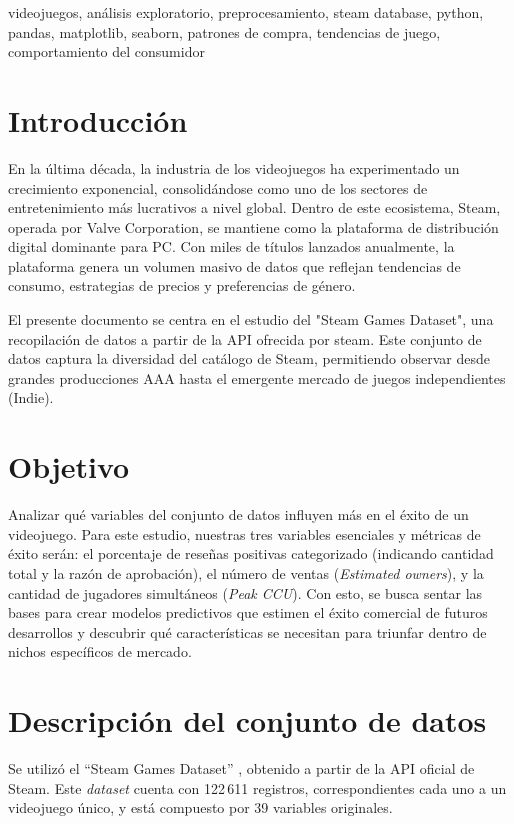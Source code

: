 \documentclass[conference]{IEEEtran}
\begin{document}
\begin{IEEEkeywords}
  videojuegos, análisis exploratorio, preprocesamiento, steam database, python, pandas, matplotlib, seaborn, patrones de compra, tendencias de juego, comportamiento del consumidor
\end{IEEEkeywords}

\section{Introducción}

En la última década, la industria de los videojuegos ha experimentado un crecimiento exponencial, consolidándose como uno de los sectores de entretenimiento más lucrativos a nivel global. Dentro de este ecosistema, Steam, operada por Valve Corporation, se mantiene como la plataforma de distribución digital dominante para PC. Con miles de títulos lanzados anualmente, la plataforma genera un volumen masivo de datos que reflejan tendencias de consumo, estrategias de precios y preferencias de género.

El presente documento se centra en el estudio del "Steam Games Dataset", una recopilación de datos a partir de la API ofrecida por steam. Este conjunto de datos captura la diversidad del catálogo de Steam, permitiendo observar desde grandes producciones AAA hasta el emergente mercado de juegos independientes (Indie).

\section{Objetivo}


Analizar qué variables del conjunto de datos influyen más en el éxito de un videojuego. Para este estudio, nuestras tres variables esenciales y métricas de éxito serán: el porcentaje de reseñas positivas categorizado (indicando cantidad total y la razón de aprobación), el número de ventas (\textit{Estimated owners}), y la cantidad de jugadores simultáneos (\textit{Peak CCU}). Con esto, se busca sentar las bases para crear modelos predictivos que estimen el éxito comercial de futuros desarrollos y descubrir qué características se necesitan para triunfar dentro de nichos específicos de mercado.

\section{Descripción del conjunto de datos}
Se utilizó el ``Steam Games Dataset'' \cite{steamDataset}, obtenido a partir de la API oficial de Steam. Este \textit{dataset} cuenta con 122\,611 registros, correspondientes cada uno a un videojuego único, y está compuesto por 39 variables originales.
\end{document}
